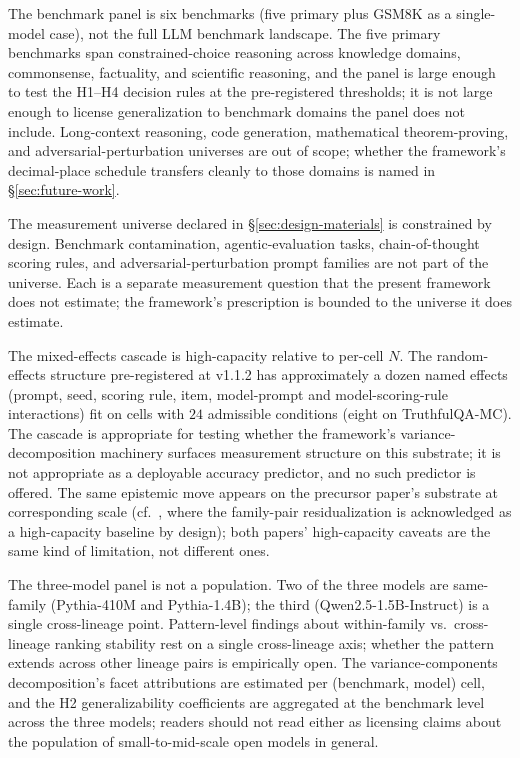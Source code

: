 \documentclass[11pt]{article}
\begin{document}
The benchmark panel is six benchmarks (five primary plus GSM8K as a single-model case), not the full LLM benchmark landscape. The five primary benchmarks span constrained-choice reasoning across knowledge domains, commonsense, factuality, and scientific reasoning, and the panel is large enough to test the H1--H4 decision rules at the pre-registered thresholds; it is not large enough to license generalization to benchmark domains the panel does not include. Long-context reasoning, code generation, mathematical theorem-proving, and adversarial-perturbation universes are out of scope; whether the framework's decimal-place schedule transfers cleanly to those domains is named in §\ref{sec:future-work}.

The measurement universe declared in §\ref{sec:design-materials} is constrained by design. Benchmark contamination, agentic-evaluation tasks, chain-of-thought scoring rules, and adversarial-perturbation prompt families are not part of the universe. Each is a separate measurement question that the present framework does not estimate; the framework's prescription is bounded to the universe it does estimate.

The mixed-effects cascade is high-capacity relative to per-cell $N$. The random-effects structure pre-registered at v1.1.2 has approximately a dozen named effects (prompt, seed, scoring rule, item, model-prompt and model-scoring-rule interactions) fit on cells with $24$ admissible conditions (eight on TruthfulQA-MC). The cascade is appropriate for testing whether the framework's variance-decomposition machinery surfaces measurement structure on this substrate; it is not appropriate as a deployable accuracy predictor, and no such predictor is offered. The same epistemic move appears on the precursor paper's substrate at corresponding scale (cf.~\citet{anonymized2026n134}, where the family-pair residualization is acknowledged as a high-capacity baseline by design); both papers' high-capacity caveats are the same kind of limitation, not different ones.

The three-model panel is not a population. Two of the three models are same-family (Pythia-410M and Pythia-1.4B); the third (Qwen2.5-1.5B-Instruct) is a single cross-lineage point. Pattern-level findings about within-family vs.\ cross-lineage ranking stability rest on a single cross-lineage axis; whether the pattern extends across other lineage pairs is empirically open. The variance-components decomposition's facet attributions are estimated per (benchmark, model) cell, and the H2 generalizability coefficients are aggregated at the benchmark level across the three models; readers should not read either as licensing claims about the population of small-to-mid-scale open models in general.
\end{document}
